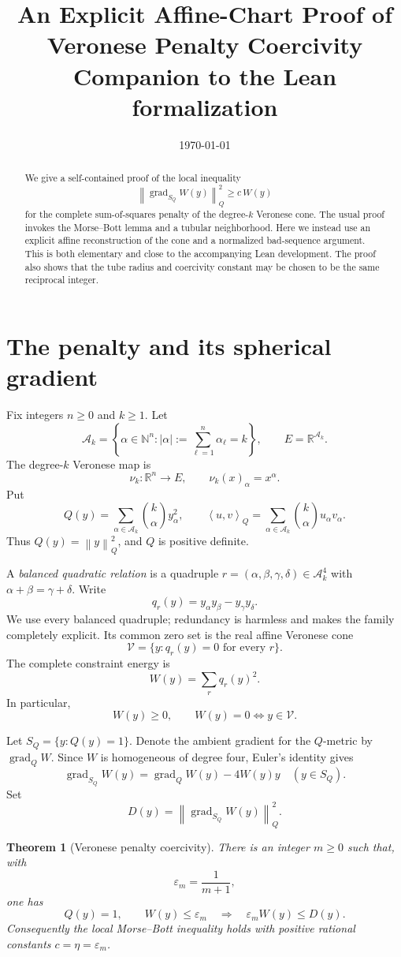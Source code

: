 \documentclass[11pt]{article}
\title{An Explicit Affine-Chart Proof of\\
Veronese Penalty Coercivity\\
\large Companion to the Lean formalization}
\author{}
\date{\today}
\newtheorem{theorem}{Theorem}
\theoremstyle{definition}
\theoremstyle{remark}
\newcommand{\R}{\mathbb R}
\newcommand{\A}{\mathcal A}
\newcommand{\V}{\mathcal V}
\newcommand{\grad}{\operatorname{grad}}
\newcommand{\inner}[2]{\left\langle #1,#2\right\rangle_Q}
\newcommand{\normQ}[1]{\left\lVert #1\right\rVert_Q}
\begin{document}
\maketitle

\begin{abstract}
We give a self-contained proof of the local inequality
\[
  \normQ{\grad_{S_Q}W(y)}^2\geq c\,W(y)
\]
for the complete sum-of-squares penalty of the degree-\(k\) Veronese
cone.  The usual proof invokes the Morse--Bott lemma and a tubular
neighborhood.  Here we instead use an explicit affine reconstruction of
the cone and a normalized bad-sequence argument.  This is both elementary
and close to the accompanying Lean development.  The proof also shows
that the tube radius and coercivity constant may be chosen to be the
same reciprocal integer.
\end{abstract}

\section{The penalty and its spherical gradient}

Fix integers \(n\geq 0\) and \(k\geq 1\).  Let
\[
  \A_k=\left\{\alpha\in\mathbb N^n:
      |\alpha|:=\sum_{\ell=1}^n\alpha_\ell=k\right\},
  \qquad E=\R^{\A_k}.
\]
The degree-\(k\) Veronese map is
\[
  \nu_k:\R^n\longrightarrow E,\qquad
  \nu_k(x)_\alpha=x^\alpha.
\]
Put
\[
  Q(y)=\sum_{\alpha\in\A_k}
      {k\choose\alpha}y_\alpha^2,
  \qquad
  \inner uv=\sum_{\alpha\in\A_k}
      {k\choose\alpha}u_\alpha v_\alpha.
\]
Thus \(Q(y)=\normQ y^2\), and \(Q\) is positive definite.

A \emph{balanced quadratic relation} is a quadruple
\(r=(\alpha,\beta,\gamma,\delta)\in\A_k^4\) with
\(\alpha+\beta=\gamma+\delta\).  Write
\[
  q_r(y)=y_\alpha y_\beta-y_\gamma y_\delta.
\]
We use every balanced quadruple; redundancy is harmless and makes the
family completely explicit.  Its common zero set is the real affine
Veronese cone
\[
  \V=\{y:q_r(y)=0\text{ for every }r\}.
\]
The complete constraint energy is
\[
  W(y)=\sum_r q_r(y)^2.
\]
In particular,
\[
  W(y)\geq0,\qquad W(y)=0\Longleftrightarrow y\in\V.
\]

Let \(S_Q=\{y:Q(y)=1\}\).  Denote the ambient gradient for the
\(Q\)-metric by \(\grad_QW\).  Since \(W\) is homogeneous of degree
four, Euler's identity gives
\[
  \grad_{S_Q}W(y)=\grad_QW(y)-4W(y)y
  \quad (y\in S_Q).
\]
Set
\[
  D(y)=\normQ{\grad_{S_Q}W(y)}^2.
\]

\begin{theorem}[Veronese penalty coercivity]\label{thm:coercivity}
There is an integer \(m\geq0\) such that, with
\[
  \varepsilon_m=\frac1{m+1},
\]
one has
\[
  Q(y)=1,\qquad W(y)\leq\varepsilon_m
  \quad\Longrightarrow\quad
  \varepsilon_m W(y)\leq D(y).
\]
Consequently the local Morse--Bott inequality holds with positive
rational constants \(c=\eta=\varepsilon_m\).
\end{theorem}
\end{document}
